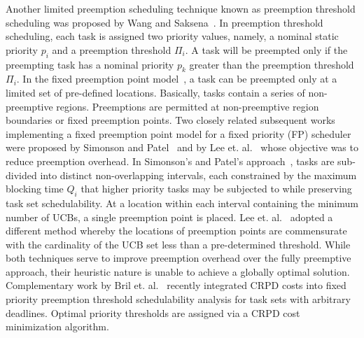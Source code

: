 Another limited preemption scheduling technique known as preemption threshold scheduling was proposed by Wang and Saksena~\cite{wang:99}.  In preemption threshold scheduling, each task is assigned two priority values, namely, a nominal static priority \begin{math}p_{i}\end{math} and a preemption threshold \begin{math}\Pi_{i}\end{math}.  A task will be preempted only if the preempting task has a nominal priority \begin{math}p_{k}\end{math} greater than the preemption threshold \begin{math}\Pi_{i}\end{math}. In the fixed preemption point model~\cite{burns:05}, a task can be preempted only at a limited set of pre-defined locations. Basically, tasks contain a series of non-preemptive regions.  Preemptions are permitted at non-preemptive region boundaries or fixed preemption points.
\newline
\indent
Two closely related subsequent works implementing a fixed preemption point model for a fixed priority (FP) scheduler were proposed by Simonson and Patel~\cite{simonson:95} and by Lee et. al.~\cite{lee:98} whose objective was to reduce preemption overhead.  In Simonson’s and Patel’s approach~\cite{simonson:95}, tasks are sub-divided into distinct non-overlapping intervals, each constrained by the maximum blocking time \begin{math}Q_{i}\end{math} that higher priority tasks may be subjected to while preserving task set schedulability.  At a location within each interval containing the minimum number of UCBs, a single preemption point is placed.  Lee et. al.~\cite{lee:98} adopted a different method whereby the locations of preemption points are commensurate with the cardinality of the UCB set less than a pre-determined threshold.   While both techniques serve to improve preemption overhead over the fully preemptive approach, their heuristic nature is unable to achieve a globally optimal solution.
\newline
\indent
Complementary work by Bril et. al.~\cite{bril:14} recently integrated CRPD costs into fixed priority preemption threshold schedulability analysis for task sets with arbitrary deadlines.  Optimal priority thresholds are assigned via a CRPD cost minimization algorithm.
\newline
